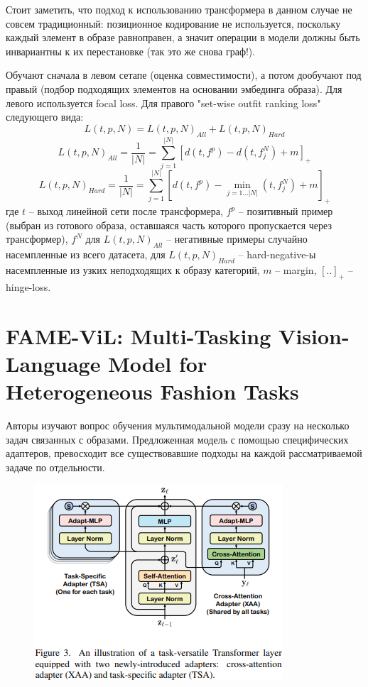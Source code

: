 \documentclass[a4paper,12pt]{article}
\begin{document}
Стоит заметить, что подход к использованию трансформера в данном случае не совсем традиционный: позиционное кодирование не используется, поскольку каждый элемент в образе равноправен, а значит операции в модели должны быть инвариантны к их перестановке (так это же снова граф!).

Обучают сначала в левом сетапе (оценка совместимости), а потом дообучают под правый (подбор подходящих элементов на основании эмбединга образа). Для левого используется focal loss. Для правого "set-wise outfit ranking loss" следующего вида: 
$$L(t, p, N) = L(t, p, N)_{All} + L(t, p, N)_{Hard}$$
$$L(t, p, N)_{All} = \frac{1}{|N|}=\sum\limits^{|N|}_{j=1}[d(t,f^p) - d(t, f_j^N)+m]_{+}$$
$$L(t, p, N)_{Hard} = \frac{1}{|N|}=\sum\limits^{|N|}_{j=1}[d(t,f^p) - \min\limits_{j=1\dots|N|}(t, f_j^N)+m]_{+}$$
где $t$ -- выход линейной сети после трансформера, $f^p$ -- позитивный пример (выбран из готового образа, оставшаяся часть которого пропускается через трансформер), $f^N$ для $L(t, p, N)_{All}$ -- негативные примеры случайно насемпленные из всего датасета, для $L(t, p, N)_{Hard}$ -- hard-negative-ы насемпленные из узких неподходящих к образу категорий, $m$ -- margin, $[..]_+$ -- hinge-loss.

\section{FAME-ViL: Multi-Tasking Vision-Language Model for\\ Heterogeneous Fashion Tasks}
Авторы изучают вопрос обучения мультимодальной модели сразу на несколько задач связанных с образами. Предложенная модель с помощью специфических адаптеров, превосходит все существовавшие подходы на каждой рассматриваемой задаче по отдельности.

\begin{figure}
	\includegraphics[scale = 1.0]{FAME-ViL_acrhitecture.png}
\end{figure}
\end{document}
